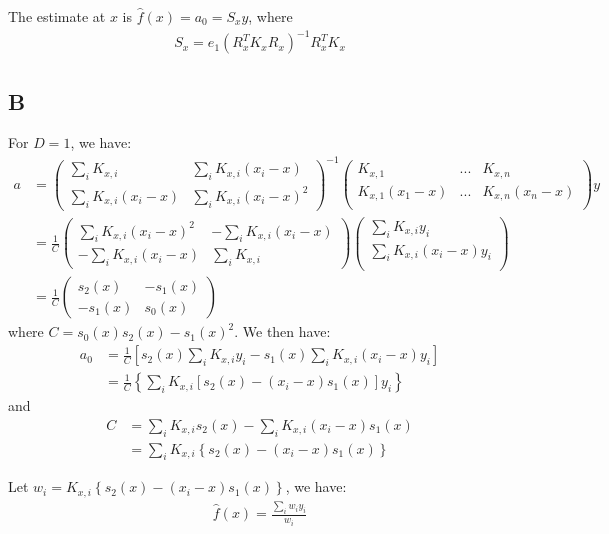 \documentclass{article}
\begin{document}
The estimate at \(x\) is \(\hat{f}(x) = a_0 = S_x y\), where
\begin{align*}
S_x = e_1 (R_x^T K_x R_x)^{-1} R_x^T K_x
\end{align*}
\subsection*{B}
For \(D=1\), we have:
\begin{align*}
a &= \begin{pmatrix}
\sum_i K_{x,i} & \sum_i K_{x,i} (x_i - x)\\
\sum_i K_{x,i} (x_i - x) & \sum_i K_{x, i} (x_i - x)^2
\end{pmatrix}^{-1} 
\begin{pmatrix}
K_{x,1} & ... & K_{x,n}\\
K_{x,1}(x_1 - x) & ... & K_{x,n}(x_n - x)\\
\end{pmatrix} y\\
&= \frac{1}{C}\begin{pmatrix}
\sum_i K_{x, i} (x_i - x)^2 & -\sum_i K_{x,i} (x_i - x)\\
-\sum_i K_{x,i} (x_i - x) &  \sum_i K_{x,i}
\end{pmatrix}
\begin{pmatrix}
\sum_i K_{x,i} y_i\\
\sum_i K_{x,i}(x_i - x) y_i\\
\end{pmatrix}\\
&= \frac{1}{C}\begin{pmatrix}
s_2(x) & -s_1(x)\\
-s_1(x) & s_0(x) 
\end{pmatrix}
\end{align*}
where \(C = s_0(x) s_2(x) - s_1(x)^2\). 
We then have:
\begin{align*}
a_0 &= \frac{1}{C} \left[ s_2(x) \sum_i K_{x,i} y_i - s_1(x) \sum_i K_{x,i} (x_i - x) y_i \right]\\
&= \frac{1}{C} \left\lbrace \sum_i K_{x,i}[ s_2(x) - (x_i - x)s_1(x) ] y_i \right\rbrace
\end{align*}
and
\begin{align*}
C &= \sum_i K_{x,i} s_2(x) - \sum_i K_{x,i} (x_i - x) s_1(x)\\
&= \sum_i K_{x,i} \left\lbrace s_2(x) - (x_i - x) s_1(x)\right\rbrace
\end{align*}

Let \( w_i = K_{x,i} \left\lbrace s_2(x) - (x_i - x)s_1(x) \right\rbrace \), we have:
\begin{align*}
\hat{f}(x) = \frac{\sum_i w_i y_i}{w_i}
\end{align*}
\end{document}
